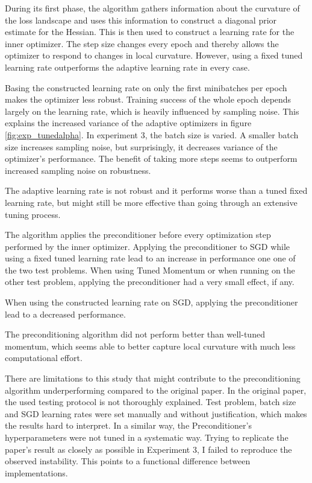 \documentclass[twoside,12pt,a4paper]{report}
\begin{document}
During its first phase, the algorithm gathers information about the curvature of the loss landscape and uses this information to construct a diagonal prior estimate for the Hessian. This is then used to construct a learning rate for the inner optimizer.
The step size changes every epoch and thereby allows the optimizer to respond to changes in local curvature. However, using a fixed tuned learning rate outperforms the adaptive learning rate in every case.

Basing the constructed learning rate on only the first minibatches per epoch makes the optimizer less robust. Training success of the whole epoch depends largely on the learning rate, which is heavily influenced by sampling noise. This explains the increased variance of the adaptive optimizers in figure \ref{fig:exp_tunedalpha}.
In experiment 3, the batch size is varied. A smaller batch size increases sampling noise, but surprisingly, it decreases variance of the optimizer's performance. The benefit of taking  more steps seems to outperform increased sampling noise on robustness.

The adaptive learning rate is not robust and it performs worse than a tuned fixed learning rate, but might still be more effective than going through an extensive tuning process.

The algorithm applies the preconditioner before every optimization step performed by the inner optimizer. Applying the preconditioner to SGD while using a fixed tuned learning rate lead to an increase in performance one one of the two test problems. When using Tuned Momentum or when running on the other test problem, applying the preconditioner had a very small effect, if any.

When using the constructed learning rate on SGD, applying the preconditioner lead to a  decreased performance.

The preconditioning algorithm did not perform better than well-tuned momentum, which seems able to better capture local curvature with much less computational effort.

There are limitations to this study that might contribute to the preconditioning algorithm underperforming compared to the original paper.
In the original paper, the used testing protocol is not thoroughly explained. Test problem, batch size and SGD learning rates were set manually and without justification, which makes the results hard to interpret. In a similar way, the Preconditioner's hyperparameters were not tuned in a systematic way.
Trying to replicate the paper's result as closely as possible in Experiment 3, I failed to reproduce the observed instability. This points to a functional difference between implementations.
\end{document}
